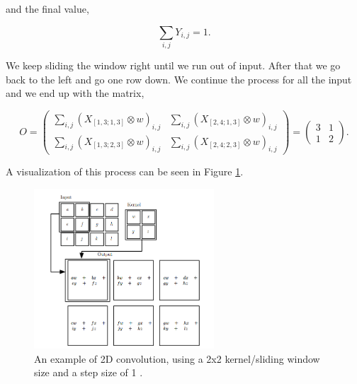 \begin{description}
        and the final value,

        \begin{equation}
            \sum_{i,j} Y_{i,j} = 1.
        \end{equation}

        We keep sliding the window right until we run out of input. After that
        we go back to the left and go one row down. We continue the process for
        all the input and we end up with the matrix,

        \begin{equation}
            O = \begin{pmatrix}
                \sum_{i,j} \left( X_{[1,3;1,3]} \otimes w \right)_{i,j} &
                \sum_{i,j} \left( X_{[2,4;1,3]} \otimes w \right)_{i,j} \\
                \sum_{i,j} \left( X_{[1,3;2,3]} \otimes w \right)_{i,j} &
                \sum_{i,j} \left( X_{[2,4;2,3]} \otimes w \right)_{i,j}
            \end{pmatrix} = \begin{pmatrix}
                3 & 1 \\
                1 & 2
            \end{pmatrix}.
        \end{equation}

        A visualization of this process can be seen in Figure
        \ref{fig:convolution_visualization}.

        \begin{figure}
        \centering
        \includegraphics[width=0.6\textwidth]{./pictures/method/convolution_visualization.png}
        \caption{An example of 2D convolution, using a 2x2 kernel/sliding window
            size and a step size of 1 \citep{Goodfellow-et-al-2016}.}
        \label{fig:convolution_visualization}
        \end{figure}


\end{description}
